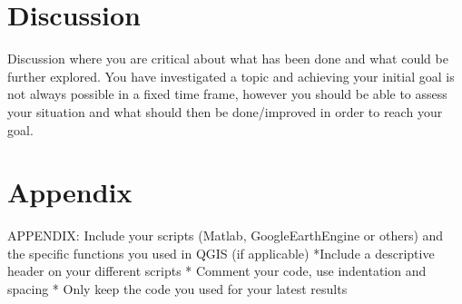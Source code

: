 \documentclass[11pt]{article}
\begin{document}
	\section{Discussion}
	Discussion where you are critical about what has been done and what could be further explored. You have investigated a topic and achieving your initial goal is not always possible in a fixed time frame, however you should be able to assess your situation and what should then be done/improved in order to reach your goal.
	
	\section{Appendix}
	APPENDIX: Include your scripts (Matlab, GoogleEarthEngine or others) and the specific functions you used in QGIS (if applicable)
	*Include a descriptive header on your different scripts
	* Comment your code, use indentation and spacing
	* Only keep the code you used for your latest results
	
	
	
	 
	
	
\end{document}
